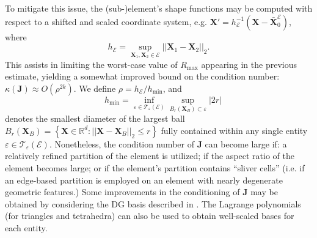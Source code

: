 To mitigate this issue, the (sub-)element's shape functions may be computed with respect to a shifted and scaled coordinate system, e.g. $\mathbf{X}' = h_\mathcal{E}^{-1} (\mathbf{X} - \bar{\mathbf{X}}^{\mathcal{E}}_0)$, where
\begin{equation}
	h_{\mathcal{E}} = \sup_{\mathbf{X}_1, \mathbf{X}_2 \in \mathcal{E}} ||\mathbf{X}_1 - \mathbf{X}_2||_2.
\end{equation}
This assists in limiting the worst-case value of $R_{\max}$ appearing in the previous estimate, yielding a somewhat improved bound on the condition number: $\kappa (\mathbf{J}) \approx O(\rho^{2k})$. We define $\rho = h_{\mathcal{E}} / h_{\min}$, and
\begin{equation}
	\quad h_{\min} = \inf_{\varepsilon \in \mathcal{T}_\varepsilon (\mathcal{E})} \sup_{B_r (\mathbf{X}_B) \subset \varepsilon} |2r|
\end{equation}
denotes the smallest diameter of the largest ball $B_r (\mathbf{X}_B) = \left\{ \mathbf{X} \in \mathbb{R}^d : ||\mathbf{X} - \mathbf{X}_B||_2 \leq r \right\}$ fully contained within any single entity $\varepsilon \in \mathcal{T}_\varepsilon (\mathcal{E})$. Nonetheless, the condition number of $\mathbf{J}$ can become large if: a relatively refined partition of the element is utilized; if the aspect ratio of the element becomes large; or if the element's partition contains ``sliver cells'' (i.e. if an edge-based partition is employed on an element with nearly degenerate geometric features.) Some improvements in the conditioning of $\mathbf{J}$ may be obtained by considering the DG basis described in \cite{Bassi:12}. The Lagrange polynomials (for triangles and tetrahedra) can also be used to obtain well-scaled bases for each entity.

